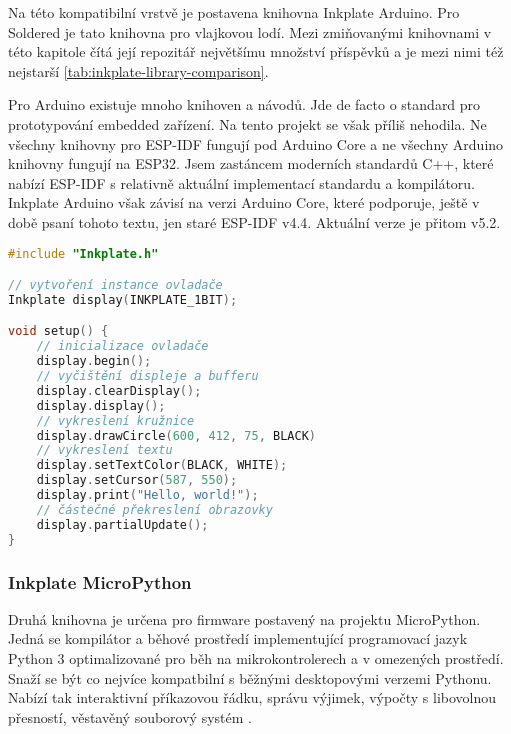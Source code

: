 Na této kompatibilní vrstvě je postavena knihovna Inkplate Arduino. Pro Soldered je tato knihovna pro vlajkovou lodí. Mezi zmiňovanými knihovnami v této kapitole čítá její repozitář největšímu množství příspěvků a je mezi nimi též nejstarší \ref{tab:inkplate-library-comparison}.

Pro Arduino existuje mnoho knihoven a návodů. Jde de facto o standard pro prototypování embedded zařízení. Na tento projekt se však příliš nehodila. Ne všechny knihovny pro ESP-IDF fungují pod Arduino Core a ne všechny Arduino knihovny fungují na ESP32. Jsem zastáncem moderních standardů C++, které nabízí ESP-IDF s relativně aktuální implementací standardu a kompilátoru. Inkplate Arduino však závisí na verzi Arduino Core, které podporuje, ještě v době psaní tohoto textu, jen staré ESP-IDF v4.4. Aktuální verze je přitom v5.2.

\begin{lstlisting}[label=src:arduino-hello-world,language=C++,caption={Ukázka programu pro vykreslení kružnice a Hello World řetězce pomocí Arduino knihovny}]
#include "Inkplate.h"

// vytvoření instance ovladače
Inkplate display(INKPLATE_1BIT);

void setup() {
    // inicializace ovladače
    display.begin();
    // vyčištění displeje a bufferu
    display.clearDisplay();
    display.display();
    // vykreslení kružnice
    display.drawCircle(600, 412, 75, BLACK)
    // vykreslení textu
    display.setTextColor(BLACK, WHITE);
    display.setCursor(587, 550);
    display.print("Hello, world!");
    // částečné překreslení obrazovky
    display.partialUpdate();
}
\end{lstlisting}

\subsubsection{Inkplate MicroPython}
Druhá knihovna je určena pro firmware postavený na projektu MicroPython. Jedná se kompilátor a běhové prostředí implementující programovací jazyk Python 3 optimalizované pro běh na mikrokontrolerech a v omezených prostředí. Snaží se být co nejvíce kompatbilní s běžnými desktopovými verzemi Pythonu. Nabízí tak interaktivní příkazovou řádku, správu výjimek, výpočty s libovolnou přesností, věstavěný souborový systém \cite{MicroPythonPythonMicrocontrollers}.

